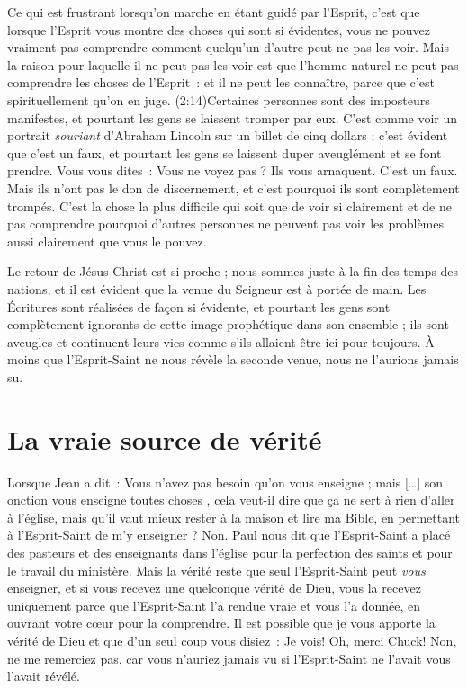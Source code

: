 Ce qui est frustrant lorsqu'on marche en étant guidé par l'Esprit,
 c'est que lorsque l'Esprit vous montre des choses qui sont si évidentes,
 vous ne pouvez vraiment pas comprendre comment quelqu'un d'autre
 peut ne pas les voir. Mais la raison pour laquelle il ne peut pas les voir
 est que l'homme naturel ne peut pas comprendre les choses de l'Esprit~:
 \og [\dots{}] et il ne peut les connaître, parce que c'est spirituellement
 qu'on en juge. \fg{}
 (2:14)Certaines personnes sont des imposteurs manifestes,
 et pourtant les gens se laissent tromper par eux.
 C'est comme voir un portrait \emph{souriant} d'Abraham Lincoln
 sur un billet de cinq dollars ; c'est évident que c'est un faux,
 et pourtant les gens se laissent duper aveuglément et se font prendre.
 Vous vous dites~: \og Vous ne voyez pas ? Ils vous arnaquent.
 C'est un faux. \fg{}
 Mais ils n'ont pas le don de discernement, et c'est pourquoi ils sont
 complètement trompés.
 C'est la chose la plus difficile qui soit que de voir si clairement
 et de ne pas comprendre pourquoi d'autres personnes ne peuvent
 pas voir les problèmes aussi clairement que vous le pouvez.

Le retour de Jésus-Christ est si proche ; nous sommes juste à la fin
 des temps des nations, et il est évident que la venue du Seigneur
 est à portée de main. Les Écritures sont réalisées de façon si évidente,
 et pourtant les gens sont complètement ignorants de cette image prophétique
 dans son ensemble ; ils sont aveugles et continuent leurs vies
 comme s'ils allaient être ici pour toujours.
 À moins que l'Esprit-Saint ne nous révèle la seconde venue,
 nous ne l'aurions jamais su.


\section{La vraie source de v\'erit\'e}

Lorsque Jean a dit~:
 \og Vous n'avez pas besoin qu'on vous enseigne ;
 mais [\dots{}] son onction vous enseigne toutes choses \fg{},
 cela veut-il dire que ça ne sert à rien d'aller à l'église,
 mais qu'il vaut mieux rester à la maison et lire ma Bible,
 en permettant à l'Esprit-Saint de m'y enseigner ? Non.
 Paul nous dit que l'Esprit-Saint a placé des pasteurs
 et des enseignants dans l'église pour la perfection des saints
 et pour le travail du ministère.
 Mais la vérité reste que seul l'Esprit-Saint peut \emph{vous} enseigner,
 et si vous recevez une quelconque vérité de Dieu,
 vous la recevez uniquement parce que l'Esprit-Saint
 l'a rendue vraie et vous l'a donnée, en ouvrant votre cœur
 pour la comprendre.
 Il est possible que je vous apporte la vérité de Dieu
 et que d'un seul coup vous disiez~: \og Je vois!
 Oh, merci Chuck! \fg{} Non, ne me remerciez pas,
 car vous n'auriez jamais vu si l'Esprit-Saint
 ne l'avait vous l'avait révélé.


